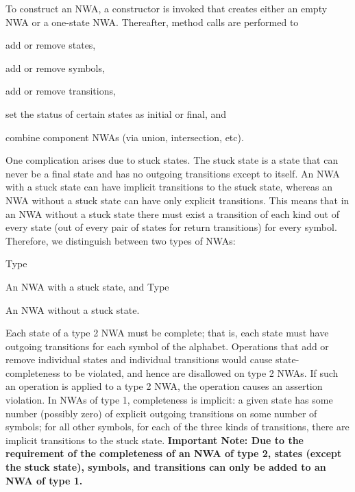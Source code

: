 \documentclass{llncs}
\begin{document}
To construct an NWA, a constructor is invoked that creates either an empty NWA or a one-state NWA.  Thereafter, method calls are performed to \begin{inparaenum} \item add or remove states, \item add or remove symbols, \item add or remove transitions, \item set the status of certain states as initial or final, and \item combine component NWAs (via union, intersection, etc). \end{inparaenum}


One complication arises due to stuck states.  The stuck state is a state that can never be a final state and has no outgoing transitions except to itself.  An NWA with a stuck state can have implicit transitions to the stuck state, whereas an NWA without a stuck state can have only explicit transitions.  This means that in an NWA without a stuck state there must exist a transition of each kind out of every state (out of every pair of states for return transitions) for every symbol.  Therefore, we distinguish between two types of NWAs: \begin{inparaenum} Type \item An NWA with a stuck state, and Type \item An NWA without a stuck state. \end{inparaenum}  Each state of a type 2 NWA must be complete; that is, each state must have outgoing transitions for each symbol of the alphabet.  Operations that add or remove individual states and individual transitions would cause state-completeness to be violated, and hence are disallowed on type 2 NWAs.  If such an operation is applied to a type 2 NWA, the operation causes an assertion violation.  In NWAs of type 1, completeness is implicit: a given state has some number (possibly zero) of explicit outgoing transitions on some number of symbols; for all other symbols, for each of the three kinds of transitions, there are implicit transitions to the stuck state.  \textbf{Important Note: Due to the requirement of the completeness of an NWA of type 2, states (except the stuck state), symbols, and transitions can only be added to an NWA of type 1.}  
\end{document}
